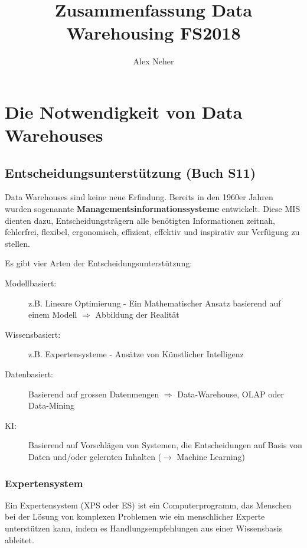 \documentclass[a4paper, 11pt]{article}
\begin{document}
\title{Zusammenfassung Data Warehousing FS2018}
\author{Alex Neher}
\maketitle

\tableofcontents
\newpage

\graphicspath{{./Pictures/}}

\section{Die Notwendigkeit von Data Warehouses}
\subsection{Entscheidungsunterstützung (Buch S11)}
Data Warehouses sind keine neue Erfindung. Bereits in den 1960er Jahren wurden sogenannte \textbf{Managementsinformationssysteme} entwickelt. Diese MIS dienten dazu, Entscheidungsträgern alle benötigten Informationen zeitnah, fehlerfrei, flexibel, ergonomisch, effizient, effektiv und inspirativ zur Verfügung zu stellen.

Es gibt vier Arten der Entscheidungsunterstützung:

\begin{description}
	\item [Modellbasiert:] z.B. Lineare Optimierung - Ein Mathematischer Ansatz basierend auf einem Modell $\Longrightarrow$ Abbildung der Realität
	\item [Wissensbasiert: ] z.B. Expertensysteme - Ansätze von Künstlicher Intelligenz
	\item [Datenbasiert: ] Basierend auf grossen Datenmengen $\Longrightarrow$ Data-Warehouse, OLAP oder Data-Mining
	\item [KI: ] Basierend auf Vorschlägen von Systemen, die Entscheidungen auf Basis von Daten und/oder gelernten Inhalten ($\longrightarrow$ Machine Learning)
\end{description}

\subsubsection{Expertensystem}
Ein Expertensystem (XPS oder ES) ist ein Computerprogramm, das Menschen bei der Lösung von komplexen Problemen wie ein menschlicher Experte unterstützen kann, indem es Handlungsempfehlungen aus einer Wissensbasis ableitet.
\end{document}
